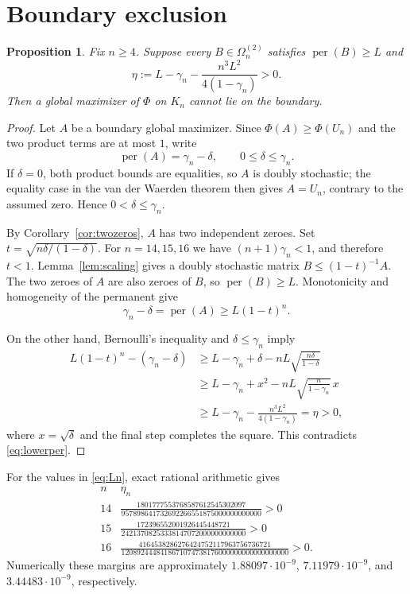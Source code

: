\documentclass[11pt]{article}
\newtheorem{proposition}[theorem]{Proposition}
\theoremstyle{remark}
\newcommand{\per}{\operatorname{per}}
\begin{document}
\section{Boundary exclusion}

\begin{proposition}\label{prop:criterion}
Fix $n\ge4$.  Suppose every $B\in\Omega_n^{(2)}$ satisfies $\per(B)\ge L$ and
\begin{equation}\label{eq:eta}
 \eta:=L-\gamma_n-\frac{n^3L^2}{4(1-\gamma_n)}>0.
\end{equation}
Then a global maximizer of $\Phi$ on $K_n$ cannot lie on the boundary.
\end{proposition}

\begin{proof}
Let $A$ be a boundary global maximizer.  Since
$\Phi(A)\ge\Phi(U_n)$ and the two product terms are at most $1$, write
\[
 \per(A)=\gamma_n-\delta,
 \qquad 0\le\delta\le\gamma_n.
\]
If $\delta=0$, both product bounds are equalities, so $A$ is doubly
stochastic; the equality case in the van der Waerden theorem then gives
$A=U_n$, contrary to the assumed zero.  Hence $0<\delta\le\gamma_n$.

By Corollary~\ref{cor:twozeros}, $A$ has two independent zeroes.  Set
$t=\sqrt{n\delta/(1-\delta)}$.  For $n=14,15,16$ we have
$(n+1)\gamma_n<1$, and therefore $t<1$.  Lemma~\ref{lem:scaling} gives a
doubly stochastic matrix $B\le (1-t)^{-1}A$.  The two zeroes of $A$ are also
zeroes of $B$, so $\per(B)\ge L$.  Monotonicity and homogeneity of the
permanent give
\begin{equation}\label{eq:lowerper}
 \gamma_n-\delta=\per(A)\ge L(1-t)^n.
\end{equation}

On the other hand, Bernoulli's inequality and $\delta\le\gamma_n$ imply
\begin{align*}
L(1-t)^n-(\gamma_n-\delta)
&\ge L-\gamma_n+\delta-nL\sqrt{\frac{n\delta}{1-\delta}}\\
&\ge L-\gamma_n+x^2-nL\sqrt{\frac{n}{1-\gamma_n}}\,x\\
&\ge L-\gamma_n-\frac{n^3L^2}{4(1-\gamma_n)}
=\eta>0,
\end{align*}
where $x=\sqrt\delta$ and the final step completes the square.  This
contradicts \eqref{eq:lowerper}.
\end{proof}

For the values in \eqref{eq:Ln}, exact rational arithmetic gives
\[
\begin{array}{c|c}
 n&\eta_n\\ \hline
14&\displaystyle
\frac{1801777553768587612545302097}
{957898641732692266551875000000000000}>0\\[3mm]
15&\displaystyle
\frac{172396552001926445448721}
{24213708253338147072000000000000}>0\\[3mm]
16&\displaystyle
\frac{4164538286276424752117963756736721}
{1208924448418671074738176000000000000000000}>0.
\end{array}
\]
Numerically these margins are approximately
$1.88097\cdot10^{-9}$, $7.11979\cdot10^{-9}$, and
$3.44483\cdot10^{-9}$, respectively.
\end{document}
